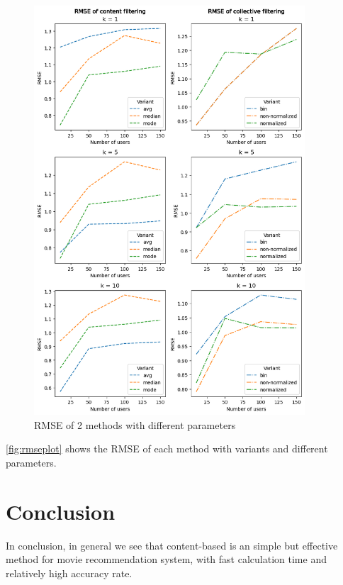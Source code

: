 \documentclass{article}
\begin{document}
\begin{figure}[htbp]
    \centering
    \includegraphics[width=0.9\textwidth]{figures/rmse-plot.png} 
    \caption{RMSE of 2 methods with different parameters}
    \label{fig:rmseplot}
\end{figure}

\autoref{fig:rmseplot} shows the RMSE of each method with variants and different parameters. 

\section{Conclusion}

In conclusion, in general we see that content-based is an simple but effective method for movie recommendation system, with fast calculation time and relatively high accuracy rate. 
\end{document}
